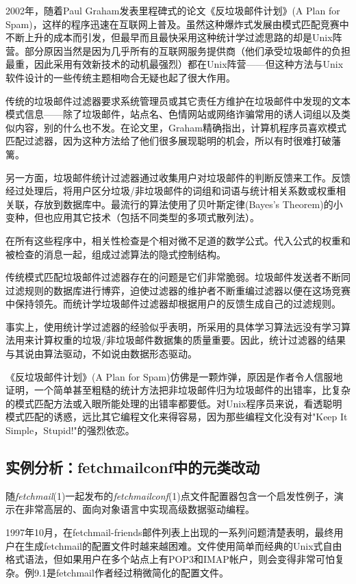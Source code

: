 \documentclass[12pt,oneside]{book}
\begin{document}
2002年，随着Paul Graham发表里程碑式的论文《反垃圾邮件计划》(A Plan for Spam)\cite{Graham}，这样的程序迅速在互联网上普及。虽然这种爆炸式发展由模式匹配竞赛中不断上升的成本而引发，但最早而且最快采用这种统计学过滤思路的却是Unix阵营。部分原因当然是因为几乎所有的互联网服务提供商（他们承受垃圾邮件的负担最重，因此采用有效新技术的动机最强烈）都在Unix阵营——但这种方法与Unix软件设计的一些传统主题相吻合无疑也起了很大作用。

传统的垃圾邮件过滤器要求系统管理员或其它责任方维护在垃圾邮件中发现的文本模式信息——除了垃圾邮件，站点名、色情网站或网络诈骗常用的诱人词组以及类似内容，别的什么也不发。在论文里，Graham精确指出，计算机程序员喜欢模式匹配过滤器，因为这种方法给了他们很多展现聪明的机会，所以有时很难打破藩篱。

另一方面，垃圾邮件统计过滤器通过收集用户对垃圾邮件的判断反馈来工作。反馈经过处理后，将用户区分垃圾/非垃圾邮件的词组和词语与统计相关系数或权重相关联，存放到数据库中。最流行的算法使用了贝叶斯定律(Bayes's Theorem)的小变种，但也应用其它技术（包括不同类型的多项式散列法）。

在所有这些程序中，相关性检查是个相对微不足道的数学公式。代入公式的权重和被检查的消息一起，组成过滤算法的隐式控制结构。

传统模式匹配垃圾邮件过滤器存在的问题是它们非常脆弱。垃圾邮件发送者不断同过滤规则的数据库进行博弈，迫使过滤器的维护者不断重编过滤器以便在这场竞赛中保持领先。而统计学垃圾邮件过滤器却根据用户的反馈生成自己的过滤规则。

事实上，使用统计学过滤器的经验似乎表明，所采用的具体学习算法远没有学习算法用来计算权重的垃圾/非垃圾邮件数据集的质量重要。因此，统计过滤器的结果与其说由算法驱动，不如说由数据形态驱动。

《反垃圾邮件计划》(A Plan for Spam)仿佛是一颗炸弹，原因是作者令人信服地证明，一个简单甚至粗糙的统计方法把非垃圾邮件归为垃圾邮件的出错率，比复杂的模式匹配方法或入眼所能处理的出错率都要低。对Unix程序员来说，看透聪明模式匹配的诱惑，远比其它编程文化来得容易，因为那些编程文化没有对"Keep It Simple，Stupid!"的强烈依恋。

\subsection{实例分析：fetchmailconf中的元类改动}
随\textit{fetchmail}(1)一起发布的\textit{fetchmailconf}(1)点文件配置器包含一个启发性例子，演示在非常高层的、面向对象语言中实现高级数据驱动编程。

1997年10月，在fetchmail-friends邮件列表上出现的一系列问题清楚表明，最终用户在生成fetchmail的配置文件时越来越困难。文件使用简单而经典的Unix式自由格式语法，但如果用户在多个站点上有POP3和IMAP帐户，则会变得非常可怕复杂。例9.1是fetchmail作者经过稍微简化的配置文件。
\end{document}
